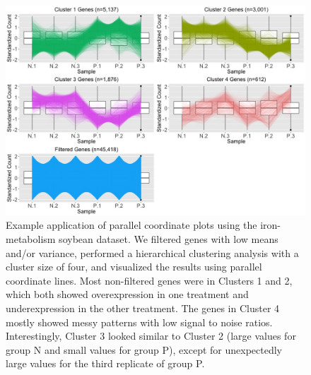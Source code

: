 \documentclass[11pt,a4paper,oldfontcommands,openany]{memoir}
\numberwithin{equation}{section} %
\begin{document}
\null
\begin{figure}[t!]
\begin{framed}
\centerline{\includegraphics[width=\columnwidth]{MakeFigures/sbIRClusters.jpg}}
\end{framed}
\caption{Example application of parallel coordinate plots using the iron-metabolism soybean dataset. We filtered genes with low means and/or variance, performed a hierarchical clustering analysis with a cluster size of four, and visualized the results using parallel coordinate lines. Most non-filtered genes were in Clusters 1 and 2, which both showed overexpression in one treatment and underexpression in the other treatment. The genes in Cluster 4 mostly showed messy patterns with low signal to noise ratios. Interestingly, Cluster 3 looked similar to Cluster 2 (large values for group N and small values for group P), except for unexpectedly large values for the third replicate of group P.
\label{sbIRClusters}}
\end{figure}
\end{document}
